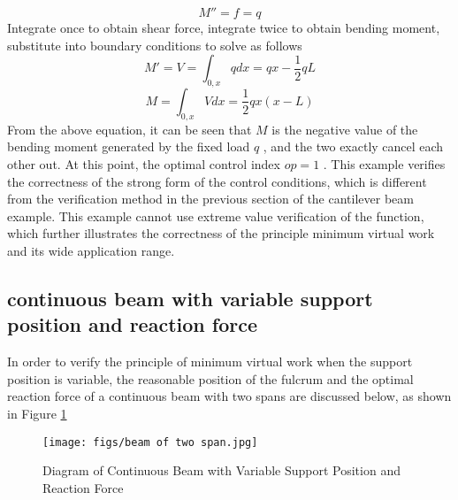 \begin{equation}\label{eq:(example.yyl.4)}
M''=f=q
\end{equation}
Integrate once to obtain shear force, integrate twice to obtain bending moment, substitute into boundary conditions to solve as follows
\begin{equation}\label{eq:(example.yyl.4)}
M'=V=\int_{0,x} q dx=qx-\frac{1} {2}qL
\end{equation}
\begin{equation}\label{eq:(example.yyl.4)}
M=\int_{0,x} V dx =\frac{1} {2}qx (x-L)
\end{equation}
From the above equation, it can be seen that $ M $ is the negative value of the bending moment generated by the fixed load $ q $ , and the two exactly cancel each other out. At this point, the optimal control index $ op=1 $ . This example verifies the correctness of the strong form of the control conditions, which is different from the verification method in the previous section of the cantilever beam example. This example cannot use extreme value verification of the function, which further illustrates the correctness of the principle minimum virtual work and its wide application range.
\subsection {continuous beam with variable support position and reaction force}
In order to verify the principle of minimum virtual work when the support position is variable, the reasonable position of the fulcrum and the optimal reaction force of a continuous beam with two spans are discussed below, as shown in Figure \ref{fig:lianxuliang}
\begin{figure}[h!] %
    \centering
    \texttt{[image: figs/beam of two span.jpg]} \caption{Diagram of Continuous Beam with Variable Support Position and Reaction Force}
    \label{fig:lianxuliang}
\end{figure}

